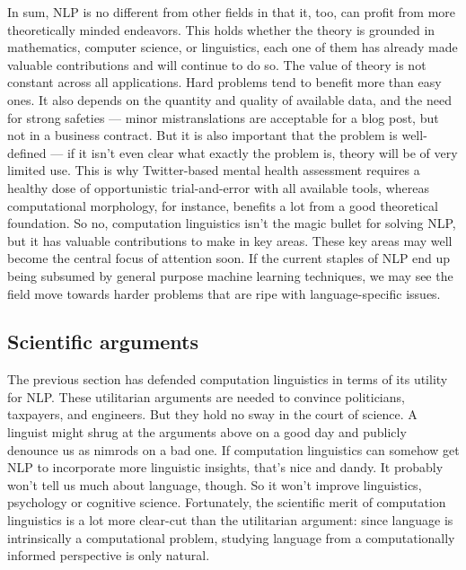 In sum, NLP is no different from other fields in that it, too, can profit from more theoretically minded endeavors.
This holds whether the theory is grounded in mathematics, computer science, or linguistics, each one of them has already made valuable contributions and will continue to do so.
The value of theory is not constant across all applications.
Hard problems tend to benefit more than easy ones.
It also depends on the quantity and quality of available data, and the need for strong safeties --- minor mistranslations are acceptable for a blog post, but not in a business contract.
But it is also important that the problem is well-defined --- if it isn't even clear what exactly the problem is, theory will be of very limited use.
This is why Twitter-based mental health assessment requires a healthy dose of opportunistic trial-and-error with all available tools, whereas computational morphology, for instance, benefits a lot from a good theoretical foundation.
So no, computation linguistics isn't the magic bullet for solving NLP, but it has valuable contributions to make in key areas.
These key areas may well become the central focus of attention soon.
If the current staples of NLP end up being subsumed by general purpose machine learning techniques, we may see the field move towards harder problems that are ripe with language-specific issues.

\subsection{Scientific arguments}
\label{ssec:formal_arguments_science}

The previous section has defended computation linguistics in terms of its utility for NLP\@. 
These utilitarian arguments are needed to convince politicians, taxpayers, and engineers.
But they hold no sway in the court of science.
A linguist might shrug at the arguments above on a good day and publicly denounce us as nimrods on a bad one.
If computation linguistics can somehow get NLP to incorporate more linguistic insights, that's nice and dandy.
It probably won't tell us much about language, though.
So it won't improve linguistics, psychology or cognitive science.
Fortunately, the scientific merit of computation linguistics is a lot more clear-cut than the utilitarian argument: since language is intrinsically a computational problem, studying language from a computationally informed perspective is only natural.

